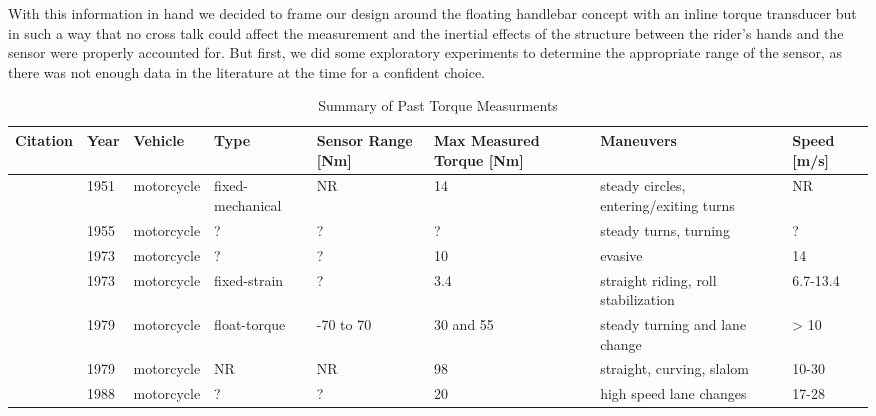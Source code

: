 \documentclass[10pt]{article}
\begin{document}

With this information in hand we decided to frame our design around the
floating handlebar concept with an inline torque transducer but in such a way
that no cross talk could affect the measurement and the inertial effects of the
structure between the rider's hands and the sensor were properly accounted for.
But first, we did some exploratory experiments to determine the appropriate
range of the sensor, as there was not enough data in the literature at the time
for a confident choice.

\begin{landscape}
\begin{table}
  \caption{Summary of Past Torque Measurments}
  \small
  \begin{tabular}{llllllll}
    \toprule
    Citation                              &  Year &     Vehicle &              Type & Sensor Range [Nm] & Max Measured Torque [Nm] &                               Maneuvers & Speed [m/s] \\
    \midrule
    \cite{Wilson-Jones1951}               &  1951 &  motorcycle &  fixed-mechanical &                NR &                       14 &  steady circles, entering/exiting turns &          NR \\
    \cite{Kondo1955}                      &  1955 &  motorcycle &                 ? &                 ? &                        ? &                   steady turns, turning &           ? \\
    \cite{Watanabe1973}                   &  1973 &  motorcycle &                 ? &                 ? &                       10 &                                 evasive &          14 \\
    \cite{Eaton1973}                      &  1973 &  motorcycle &      fixed-strain &                 ? &                      3.4 &     straight riding, roll stabilization &    6.7-13.4 \\
    \cite{Weir1979a}                      &  1979 &  motorcycle &      float-torque &         -70 to 70 &                30 and 55 &          steady turning and lane change &        > 10 \\
    \cite{Aoki1979}                       &  1979 &  motorcycle &                NR &                NR &                       98 &               straight, curving, slalom &       10-30 \\
    \cite{Sugizaki1988}                   &  1988 &  motorcycle &                 ? &                 ? &                       20 &                 high speed lane changes &       17-28 \\

\end{tabular}
\end{table}
\end{landscape}
\end{document}
